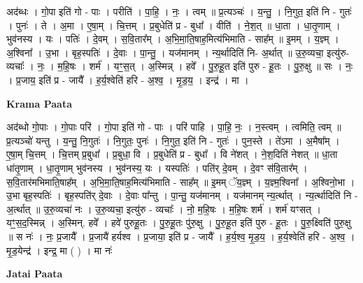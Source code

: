 \documentclass[17pt]{extarticle}
\begin{document}
अद॑ब्धः । गो॒पा इति॑ गो - पाः । परीति॑ । पा॒हि॒ । नः॒ । त्वम् ॥ प्र॒त्यञ्चः॑ । य॒न्तु॒ । नि॒गुत॒ इति॑ नि - गुतः॑ । पुनः॑ । ते । अ॒मा । ए॒षा॒म् । चि॒त्तम् । प्र॒बुधेति॑ प्र - बुधा᳚ । वीति॑ । ने॒श॒त् ॥ धा॒ता । धा॒तृ॒णाम् । भुव॑नस्य । यः । पतिः॑ । दे॒वम् । स॒वि॒तार᳚म् । अ॒भि॒मा॒ति॒षाह॒मित्य॑भिमाति - साह᳚म् ॥ इ॒मम् । य॒ज्ञ्म् । अ॒श्विना᳚ । उ॒भा । बृह॒स्पतिः॑ । दे॒वाः । पा॒न्तु॒ । यज॑मानम् । न्य॒र्थादिति॑ नि- अ॒र्थात् ॥ उ॒रु॒व्यचा॒ इत्यु॑रु-व्यचाः᳚ । नः॒ । म॒हि॒षः । शर्म॑ । यꣳ॒॒स॒त् । अ॒स्मिन्न् । हवे᳚ । पु॒रु॒हू॒त इति॑ पुरु - हू॒तः । पु॒रु॒क्षु ॥ सः । नः॒ । प्र॒जाय॒ इति॑ प्र - जायै᳚ । ह॒र्य॒श्वेति॑ हरि - अ॒श्व॒ । मृ॒ड॒य॒ । इन्द्र॑ । मा ।  \newline


\textbf{Krama Paata} \newline

अद॑ब्धो गो॒पाः । गो॒पाः परि॑ । गो॒पा इति॑ गो - पाः । परि॑ पाहि । पा॒हि॒ नः॒ । न॒स्त्वम् । त्वमिति॒ त्वम् ॥ प्र॒त्यञ्चो॑ यन्तु । य॒न्तु॒ नि॒गुतः॑ । नि॒गुतः॒ पुनः॑ । नि॒गुत॒ इति॑ नि - गुतः॑ । पुन॒स्ते । ते॑ऽमा । अ॒मैषा᳚म् । ए॒षा॒म् चि॒त्तम् । चि॒त्तम् प्र॒बुधा᳚ । प्र॒बुधा॒ वि । प्र॒बुधेति॑ प्र - बुधा᳚ । वि ने॑शत् । ने॒श॒दिति॑ नेशत् ॥ धा॒ता धा॑तृ॒णाम् । धा॒तृ॒णाम् भुव॑नस्य । भुव॑नस्य॒ यः । यस्पतिः॑ । पति॑र् दे॒वम् । दे॒वꣳ स॑वि॒तार᳚म् । स॒वि॒तार॑मभिमाति॒षाह᳚म् । अ॒भि॒मा॒ति॒षाह॒मित्य॑भिमाति - साह᳚म् ॥ इ॒मम् ॅय॒ज्ञ्म् । य॒ज्ञ्म॒श्विना᳚ । अ॒श्विनो॒भा । उ॒भा बृह॒स्पतिः॑ । बृह॒स्पति॑र् दे॒वाः । दे॒वाः पा᳚न्तु । पा॒न्तु॒ यज॑मानम् । यज॑मानम् न्य॒र्त्थात् । न्य॒र्त्थादिति॑ नि - अ॒र्त्थात् ॥ उ॒रु॒व्यचा॑ नः । उ॒रु॒व्यचा॒ इत्यु॑रु - व्यचाः᳚ । नो॒ म॒हि॒षः । म॒हि॒षः शर्म॑ । शर्म॑ यꣳसत् । यꣳ॒॒स॒द॒स्मिन्न् । अ॒स्मिन्. हवे᳚ । हवे॑ पुरुहू॒तः । पु॒रु॒हू॒तः पु॑रु॒क्षु । पु॒रु॒हू॒त इति॑ पुरु - हू॒तः । पु॒रु॒क्ष्विति॑ पुरु॒क्षु ॥ स नः॑ । नः॒ प्र॒जायै᳚ । प्र॒जायै॑ हर्यश्व । प्र॒जाया॒ इति॑ प्र - जायै᳚ । ह॒र्य॒श्व॒ मृ॒ड॒य॒ । ह॒र्य॒श्वेति॑ हरि - अ॒श्व॒ । मृ॒ड॒येन्द्र॑ । इन्द्र॒ मा ( ) । मा नः॑ \newline

\textbf{Jatai Paata} \newline
\end{document}
